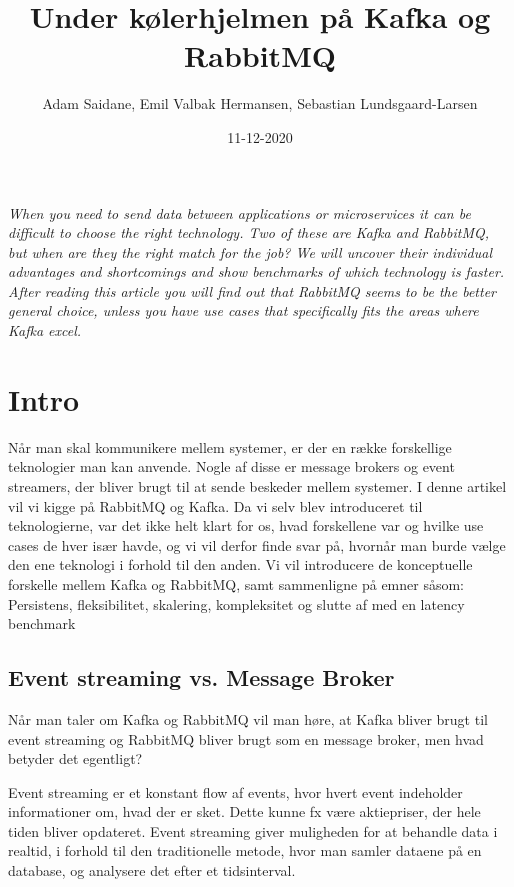 \documentclass[
]{article}
\title{Under kølerhjelmen på Kafka og RabbitMQ}
\author{Adam Saidane, Emil Valbak Hermansen, Sebastian Lundsgaard-Larsen}
\date{11-12-2020}
\begin{document}
\maketitle
\textit{When you need to send data between applications or microservices it can be difficult to choose the right technology. Two of these are Kafka and RabbitMQ, but when are they the right match for the job? We will uncover their individual advantages and shortcomings and show benchmarks of which technology is faster. After reading this article you will find out that RabbitMQ seems to be the better general choice, unless you have use cases that specifically fits the areas where Kafka excel.}
\hypertarget{intro}{%
\section{Intro}\label{intro}}

Når man skal kommunikere mellem systemer, er der en række forskellige
teknologier man kan anvende. Nogle af disse er message brokers og event
streamers, der bliver brugt til at sende beskeder mellem systemer. I
denne artikel vil vi kigge på RabbitMQ og Kafka. Da vi selv blev
introduceret til teknologierne, var det ikke helt klart for os, hvad
forskellene var og hvilke use cases de hver især havde, og vi vil derfor
finde svar på, hvornår man burde vælge den ene teknologi i forhold til
den anden. Vi vil introducere de konceptuelle forskelle mellem Kafka og
RabbitMQ, samt sammenligne på emner såsom: Persistens, fleksibilitet,
skalering, kompleksitet og slutte af med en latency benchmark

\hypertarget{event-streaming-vs.-message-broker}{%
\subsection{Event streaming vs. Message
Broker}\label{event-streaming-vs.-message-broker}}

Når man taler om Kafka og RabbitMQ vil man høre, at Kafka bliver brugt
til event streaming og RabbitMQ bliver brugt som en message broker, men
hvad betyder det egentligt?


Event streaming er et konstant flow af events, hvor hvert event
indeholder informationer om, hvad der er sket. Dette kunne fx være
aktiepriser, der hele tiden bliver opdateret. Event streaming giver
muligheden for at behandle data i realtid, i forhold til den
traditionelle metode, hvor man samler dataene på en database, og
analysere det efter et tidsinterval.\cite{event-streaming}
\end{document}
